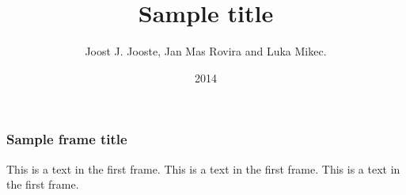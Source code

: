 \documentclass{beamer}
\title{Sample title}
\author{Joost J. Jooste, Jan Mas Rovira and Luka Mikec.}
\institute{Universitat de Barcelona}
\date{2014}
\begin{document}
\frame{\titlepage}

\begin{frame}
  \frametitle{Sample frame title}
  This is a text in the first frame. This is a text in the first frame. This is a text in the first frame.
\end{frame}
\end{document}

